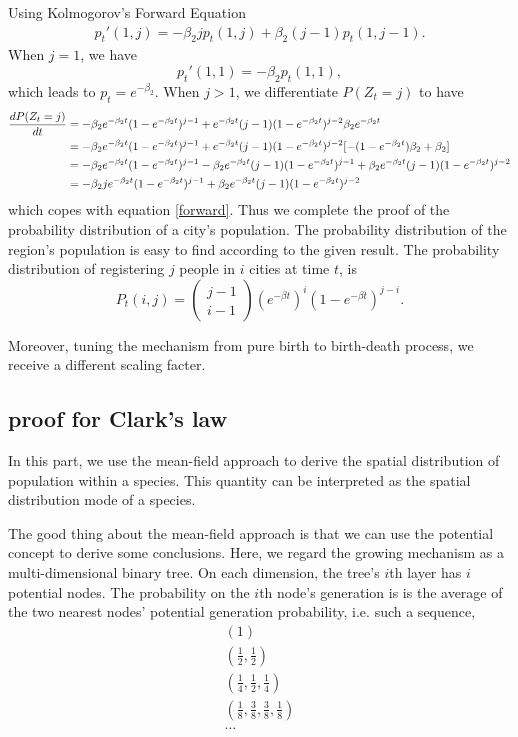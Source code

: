 \documentclass[aps,prl]{revtex4-1}
\begin{document}
Using Kolmogorov’s Forward Equation
\begin{align}p_t'(1,j) = -\beta_2 j p_t(1,j) + \beta_2 (j-1) p_t(1,j-1).\label{forward}\end{align}  When $j = 1$, we have \[p_t'(1,1) = -\beta_2 p_t(1,1), \] which leads to $p_t=e^{-\beta_2}$. When $j>1$, we differentiate $P(Z_t = j)$ to have 
\begin{align}
	\frac{dP(Z_t = j)}{dt} &= -\beta_2e^{-\beta_2 t} (1-e^{-\beta_2 t})^{j-1} + e^{-\beta_2 t}(j-1)(1-e^{-\beta_2 t})^{j-2}\beta_2 e^{-\beta_2 t}\notag\\
	&= -\beta_2 e^{-\beta_2 t}(1-e^{-\beta_2 t})^{j-1} + e^{-\beta_2 t}(j-1)(1-e^{-\beta_2 t})^{j-2} [-(1-e^{-\beta_2 t})\beta_2+\beta_2]\notag\\
	&= -\beta_2 e^{-\beta_2 t}(1-e^{-\beta_2 t})^{j-1} -\beta_2 e^{-\beta_2 t}(j-1)(1-e^{-\beta_2 t})^{j-1} +\beta_2e^{-\beta_2 t}(j-1)(1-e^{-\beta_2 t})^{j-2}\notag\\
	&= -\beta_2 j e^{-\beta_2 t}(1-e^{-\beta_2 t})^{j-1} +\beta_2e^{-\beta_2 t}(j-1)(1-e^{-\beta_2 t})^{j-2}
\end{align}
which copes with equation \ref{forward}. Thus we complete the proof of the probability distribution of a city's population. The probability distribution of the region's population is easy to find according to the given result. The probability distribution of registering $j$ people in $i$ cities at time $t$, is \[ P_t(i,j) = \left(\begin{array}{c}{j-1} \\ {i-1}\end{array}\right)\left(e^{-\beta t}\right)^{i}\left(1-e^{-\beta t}\right)^{j-i}. \]

Moreover, tuning the mechanism from pure birth to birth-death process, we receive a different scaling facter.

\subsection{proof for Clark's law}

In this part, we use the mean-field approach to derive the spatial distribution of population within a species. This quantity can be interpreted as the spatial distribution mode of a species. 

The good thing about the mean-field approach is that we can use the potential concept to derive some conclusions. Here, we regard the growing mechanism as a multi-dimensional binary tree. On each dimension, the tree's $i$th layer has $i$ potential nodes. The probability on the $i$th node's generation is is the average of the two nearest nodes' potential generation probability, i.e. such a sequence,
\begin{align*}
(1)\\
(\frac{1}{2},\frac{1}{2})\\
(\frac{1}{4},\frac{1}{2},\frac{1}{4})\\
(\frac{1}{8},\frac{3}{8},\frac{3}{8},\frac{1}{8})\\
\dots
\end{align*}
\end{document}
